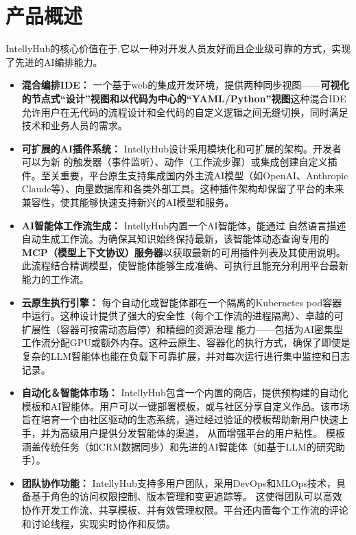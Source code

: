 \documentclass[11点, A4纸, 单面]{article}
\begin{document}
\section{产品概述}
IntellyHub的核心价值在于,它以一种对开发人员友好而且企业级可靠的方式，实现了先进的AI编排能力。
\begin{itemize}
    \item \textbf{混合编排IDE：} 一个基于web的集成开发环境，提供两种同步视图——\textbf{可视化的节点式“设计”视图和以代码为中心的“YAML/Python”视图}这种混合IDE允许用户在无代码的流程设计和全代码的自定义逻辑之间无缝切换，同时满足技术和业务人员的需求。
    
    \item \textbf{可扩展的AI插件系统：} IntellyHub设计采用模块化和可扩展的架构。开发者可以为新 的触发器（事件监听）、动作（工作流步骤）或集成创建自定义插件。至关重要，平台原生支持集成国内外主流AI模型（如OpenAI、Anthropic Claude等）、向量数据库和各类外部工具。这种插件架构却保留了平台的未来兼容性，使其能够快速支持新兴的AI模型和服务。
    
    \item \textbf{ AI智能体工作流生成：} IntellyHub内置一个AI智能体，能通过 自然语言描述自动生成工作流。为确保其知识始终保持最新，该智能体动态查询专用的\textbf{MCP（模型上下文协议）服务器}以获取最新的可用插件列表及其使用说明。此流程结合精调模型，使智能体能够生成准确、可执行且能充分利用平台最新能力的工作流。
    
    \item \textbf{云原生执行引擎：} 每个自动化或智能体都在一个隔离的Kubernetes pod容器中运行。这种设计提供了强大的安全性（每个工作流的进程隔离）、卓越的可扩展性（容器可按需动态启停）和精细的资源治理 能力——包括为AI密集型工作流分配GPU或额外内存。这种云原生、容器化的执行方式，确保了即使是复杂的LLM智能体也能在负载下可靠扩展，并对每次运行进行集中监控和日志记录。
    
    \item \textbf{自动化＆智能体市场：} IntellyHub包含一个内置的商店，提供预构建的自动化模板和AI智能体。用户可以一键部署模板，或与社区分享自定义作品。该市场旨在培育一个由社区驱动的生态系统，通过经过验证的模板帮助新用户快速上手，并为高级用户提供分发智能体的渠道， 从而增强平台的用户粘性。 模板涵盖传统任务（如CRM数据同步）和先进的AI智能体（如基于LLM的研究助手）。
    
    \item \textbf{团队协作功能：} IntellyHub支持多用户团队，采用DevOps和MLOps技术，具备基于角色的访问权限控制、版本管理和变更追踪等。 这使得团队可以高效协作开发工作流、共享模板、并有效管理权限。平台还内置每个工作流的评论和讨论线程，实现实时协作和反馈。
\end{itemize}
\end{document}
